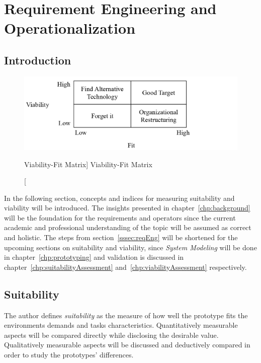 
\chapter{Requirement Engineering and Operationalization}\label{chp:operationalization}

\section{Introduction}

\begin{figure}[ht]
    \includegraphics[width=\linewidth]{images/methodology/viabFit.PNG}\centering
    \caption
    [Viability-Fit Matrix]
    {Viability-Fit Matrix \cite{Liang2004IntroductionApplications}}
\end{figure}

In the following section, concepts and indices for measuring suitability and viability will be introduced. The insights presented in chapter~\vref{chp:background} will be the foundation for the requirements and operators since the current academic and professional understanding of the topic will be assumed as correct and holistic. The steps from section~\vref{sssec:reqEng} will be shortened for the upcoming sections on suitability and viability, since \textit{System Modeling} will be done in chapter~\vref{chp:prototyping} and validation is discussed in chapter~\vref{chp:suitabilityAssessment} and~\vref{chp:viabilityAssessment} respectively.  

\section{Suitability}

The author defines \textit{suitability} as the measure of how well the prototype fits the environments demands and tasks characteristics. Quantitatively measurable aspects will be compared directly while disclosing the desirable value. Qualitatively measurable aspects will be discussed and deductively compared in order to study the prototypes' differences. 

